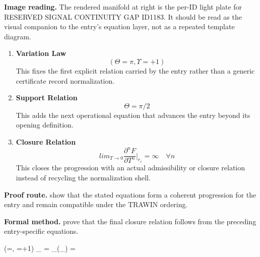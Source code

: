 \begin{samepage}
\noindent\begin{minipage}[t]{0.45\linewidth}
\vspace{0pt}
\raggedright
\scriptsize\textbf{Image reading.} The rendered manifold at right is the per-ID light plate for RESERVED SIGNAL CONTINUITY GAP ID1183. It should be read as the visual companion to the entry's equation layer, not as a repeated template diagram.\par
\end{minipage}\hfill
\begin{minipage}[t]{0.53\linewidth}
\vspace*{-0.10in}
\raggedright
{}
\end{minipage}
\end{samepage}

\clearpage


\begin{enumerate}[leftmargin=1.6em,itemsep=9pt,topsep=6pt]
\item \textbf{Variation Law}
\[
(\Theta=\pi, \Upsilon=+1)
\]
This fixes the first explicit relation carried by the entry rather than a generic certificate record normalization.

\item \textbf{Support Relation}
\[
\Theta = \pi/2
\]
This adds the next operational equation that advances the entry beyond its opening definition.

\item \textbf{Closure Relation}
\[
lim_{T \to 0} \frac{\partial^n F}{\partial T^n}\bigg|_{r_c} = \infty \quad \forall n
\]
This closes the progression with an actual admissibility or closure relation instead of recycling the normalization shell.
\end{enumerate}

\textbf{Proof route.} show that the stated equations form a coherent progression for the entry and remain compatible under the TRAWIN ordering.

\textbf{Formal method.} prove that the final closure relation follows from the preceding entry-specific equations.

\medskip
{}

\begin{tzpsnapshot}
\end{tzpsnapshot}

\tzpequationlinks
  {(\Theta=\pi, \Upsilon=+1)}
  {_{} = \cdots}
  {_{}\!\left(_{}\right) = \cdots}
